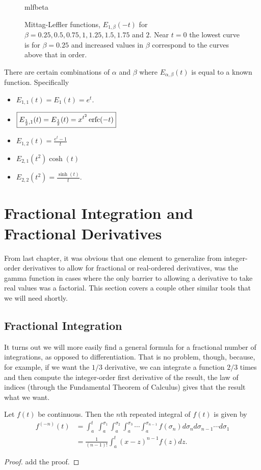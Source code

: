 \begin{figure}
  \centering
  {mlfbeta}
  \caption{Mittag-Leffler functions, $E_{1, \beta}(-t)$ for $\beta = 0.25, 0.5, 0.75, 1, 1.25, 1.5, 1.75$ and $2$. Near $t=0$ the lowest curve is for $\beta = 0.25$ and increased values in $\beta$ correspond to the curves above that in order.}
  \label{fig:mlfbeta}
\end{figure}

There are certain combinations of $\alpha$ and $\beta$ where $E_{\alpha,\beta}(t)$ is equal to a known function. Specifically
\begin{itemize}
  \item $\boxed{ E_{1,1}(t) = E_1(t) = e^t. }$
  \item $\boxed{ E_{\frac{1}{2},1} (t) = E_\frac{1}{2}(t) = x^{t^2} \operatorname{erfc}(-t)  }$
  \item $\boxed{ E_{1,2}(t) = \frac{e^t - 1}{t}  }$
  \item $\boxed{ E_{2,1}(t^2) \cosh(t) }$
  \item $\boxed{ E_{2,2 }(t^2) = \frac{\sinh(t)}{t}. }$
\end{itemize}


\section{Fractional Integration and Fractional Derivatives}

From last chapter, it was obvious that one element to generalize from integer-order derivatives to allow for fractional or real-ordered derivatives, was the gamma function in cases where the only barrier to allowing a derivative to take real values was a factorial. This section covers a couple other similar tools that we will need shortly.

\subsection{Fractional Integration}

It turns out we will more easily find a general formula for a fractional number of integrations, as opposed to differentiation. That is no problem, though, because, for example, if we want the $1/3$ derivative, we can integrate a function $2/3$ times and then compute the integer-order first derivative of the result, the law of indices (through the Fundamental Theorem of Calculus) gives that the result what we want. 

\begin{theorem}
  Let $f(t)$ be continuous. Then the $n$th repeated integral of $f(t)$ is given by
  \begin{align}
   f^{(-n)}(t) &= \int_a^{t}  \ \int_a^{\sigma_1}  \int_a^{\sigma_2}  \int_a^{\sigma_3} \cdots \int_a^{\sigma_{n-1}} f(\sigma_n) d \sigma_n d \sigma_{n-1} \cdots d \sigma_1 \nonumber  \\
   &= \frac{1}{\left( n - 1 \right)!} \int_a^t \left( x - z \right)^{n-1} f(z) dz.
    \label{eq:cauchy}
  \end{align}
 \label{th:cauchy}
\end{theorem}
\begin{proof}
add the proof.
\end{proof}

